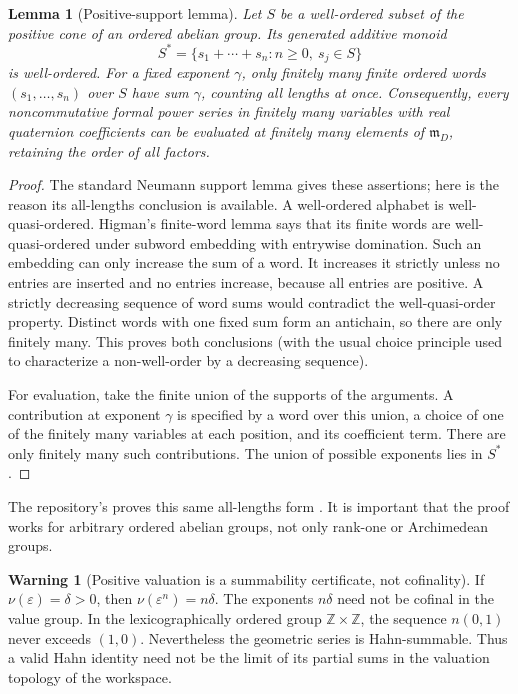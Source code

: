 \documentclass[11pt,letterpaper]{article}
\newtheorem{lemma}[theorem]{Lemma}
\theoremstyle{definition}
\newtheorem{warning}[theorem]{Warning}
\newcommand{\Z}{\mathbb Z}
\newcommand{\mm}{\mathfrak m}
\newcommand{\val}{\nu}
\begin{document}
\begin{lemma}[Positive-support lemma]
\label{lem:neumann}
Let $S$ be a well-ordered subset of the positive cone of an ordered abelian
group. Its generated additive monoid
\[
 S^*=\{s_1+\cdots+s_n:n\ge0,\ s_j\in S\}
\]
is well-ordered. For a fixed exponent $\gamma$, only finitely many finite
ordered words $(s_1,\ldots,s_n)$ over $S$ have sum $\gamma$, counting all lengths
at once. Consequently, every noncommutative formal power series in finitely
many variables with real quaternion coefficients can be evaluated at finitely
many elements of $\mm_D$, retaining the order of all factors.
\end{lemma}
\begin{proof}
The standard Neumann support lemma gives these assertions; here is the reason
its all-lengths conclusion is available. A well-ordered alphabet is
well-quasi-ordered. Higman's finite-word lemma says that its finite words are
well-quasi-ordered under subword embedding with entrywise domination. Such an
embedding can only increase the sum of a word. It increases it strictly unless
no entries are inserted and no entries increase, because all entries are
positive. A strictly decreasing sequence of word sums would contradict the
well-quasi-order property. Distinct words with one fixed sum form an antichain,
so there are only finitely many. This proves both conclusions (with the usual
choice principle used to characterize a non-well-order by a decreasing
sequence).

For evaluation, take the finite union of the supports of the arguments. A
contribution at exponent $\gamma$ is specified by a word over this union, a
choice of one of the finitely many variables at each position, and its
coefficient term. There are only finitely many such contributions. The union
of possible exponents lies in $S^*$.
\end{proof}
The repository's  proves this same
all-lengths form \cite{repo}. It is important
that the proof works for arbitrary ordered abelian groups, not only rank-one
or Archimedean groups.

\begin{warning}[Positive valuation is a summability certificate, not cofinality]
If $\val(\varepsilon)=\delta>0$, then $\val(\varepsilon^n)=n\delta$.
The exponents $n\delta$ need not be cofinal in the value group. In the
lexicographically ordered group $\Z\times\Z$, the sequence $n(0,1)$ never exceeds
$(1,0)$. Nevertheless the geometric series is Hahn-summable. Thus a valid Hahn
identity need not be the limit of its partial sums in the valuation topology of
the workspace.
\end{warning}
\end{document}
